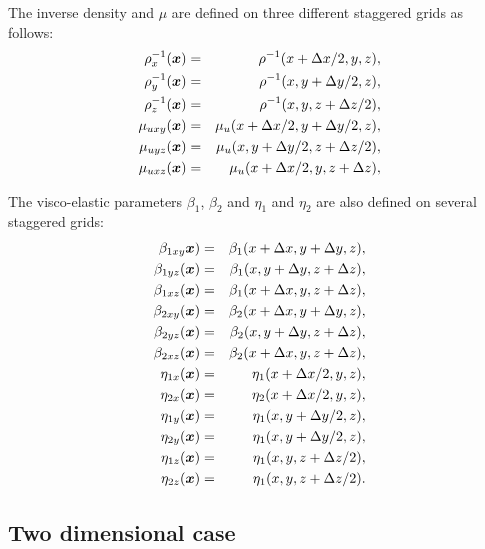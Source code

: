 \documentclass[11pt]{article}
\begin{document}
The inverse density and $\mu$ are defined  on three different staggered grids as follows:
\begin{eqnarray}
   \rho_x^{-1}(\mbox{\boldmath $x$}) & = & \rho^{-1}(x+\Delta x/2, y, z),       \nonumber\\
   \rho_y^{-1}(\mbox{\boldmath $x$}) & = & \rho^{-1}(x,y+\Delta y/2, z),        \nonumber\\
   \rho_z^{-1}(\mbox{\boldmath $x$}) & = &\rho^{-1}(x,y,z+\Delta z/2),          \nonumber\\
   \mu_{uxy}(\mbox{\boldmath $x$}) & = &   \mu_u(x+\Delta x/2, y+\Delta y/2, z),\nonumber\\
   \mu_{uyz}(\mbox{\boldmath $x$}) & = &   \mu_u(x, y+\Delta y/2, z+\Delta z/2),\nonumber\\
   \mu_{uxz}(\mbox{\boldmath $x$}) & = &   \mu_u(x+\Delta x/2, y,z+\Delta z),   \nonumber\\
\end{eqnarray}

The visco-elastic parameters $\beta_1$, $\beta_2$ and $\eta_1$ and $\eta_2$ 
are also defined on several staggered grids:
\begin{eqnarray}
   \beta_{1xy}\mbox{\boldmath $x$}) & = &   \beta_1(x+\Delta x, y+\Delta y, z),\nonumber\\
   \beta_{1yz}(\mbox{\boldmath $x$}) & = &  \beta_1(x,y+\Delta y, z+\Delta z),\nonumber\\
   \beta_{1xz}(\mbox{\boldmath $x$}) & = &  \beta_1(x+\Delta x, y,z+\Delta z),\nonumber\\
   \beta_{2xy}(\mbox{\boldmath $x$}) & = &  \beta_2(x+\Delta x, y+\Delta y, z),\nonumber\\
   \beta_{2yz}(\mbox{\boldmath $x$}) & = &  \beta_2(x,y+\Delta y, z+\Delta z),\nonumber\\
   \beta_{2xz}(\mbox{\boldmath $x$}) & = &  \beta_2(x+\Delta x, y,z+\Delta z),         \\
   \eta_{1x}(\mbox{\boldmath $x$}) & = &   \eta_1(x+\Delta x/2,y,z),          \nonumber\\
   \eta_{2x}(\mbox{\boldmath $x$}) & = &   \eta_2(x+\Delta x/2,y,z),          \nonumber\\
   \eta_{1y}(\mbox{\boldmath $x$}) & = &   \eta_1(x,y+\Delta y/2,z),          \nonumber\\
   \eta_{2y}(\mbox{\boldmath $x$}) & = &   \eta_1(x,y+\Delta y/2,z),          \nonumber\\
   \eta_{1z}(\mbox{\boldmath $x$}) & = &   \eta_1(x,y,z+\Delta z/2),          \nonumber\\
   \eta_{2z}(\mbox{\boldmath $x$}) & = &   \eta_1(x,y,z+\Delta z/2).
\end{eqnarray}

\subsection{Two dimensional case}
\end{document}
